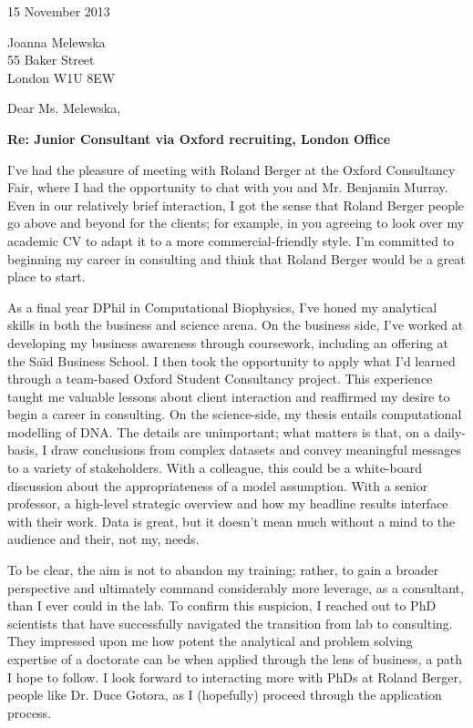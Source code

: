 \documentclass[a4paper]{../res}
\begin{document}
 
\begin{sloppypar}
 
%


\begin{resume} 

15 November 2013

Joanna Melewska \\
55 Baker Street \\
London W1U 8EW

Dear Ms. Melewska,

\textbf{Re: Junior Consultant via Oxford recruiting, London Office}

I've had the pleasure of meeting with Roland Berger at the Oxford Consultancy Fair, where I had the opportunity to chat with you and Mr. Benjamin Murray. Even in our relatively brief interaction, I got the sense that Roland Berger people go above and beyond for the clients; for example, in you agreeing to look over my academic CV to adapt it to a more commercial-friendly style. I'm committed to beginning my career in consulting and think that Roland Berger would be a great place to start. 

As a final year DPhil in Computational Biophysics, I've honed my analytical skills in both the business and science arena. On the business side, I've worked at developing my business awareness through coursework, including an offering at the Sa\"\i d Business School. I then took the opportunity to apply what I'd learned through a team-based Oxford Student Consultancy project. This experience taught me valuable lessons about client interaction and reaffirmed my desire to begin a career in consulting. On the science-side, my thesis entails computational modelling of DNA. The details are unimportant; what matters is that, on a daily-basis, I draw conclusions from complex datasets and convey meaningful messages to a variety of stakeholders. With a colleague, this could be a white-board discussion about the appropriateness of a model assumption. With a senior professor, a high-level strategic overview and how my headline results interface with their work. Data is great, but it doesn't mean much without a mind to the audience and their, not my, needs. 

To be clear, the aim is not to abandon my training; rather, to gain a broader perspective and ultimately command considerably more leverage, as a consultant, than I ever could in the lab. To confirm this suspicion, I reached out to PhD scientists that have successfully navigated the transition from lab to consulting. They impressed upon me how potent the analytical and problem solving expertise of a doctorate can be when applied through the lens of business, a path I hope to follow. I look forward to interacting more with PhDs at Roland Berger, people like Dr. Duce Gotora, as I (hopefully) proceed through the application process.



\end{resume}
\end{sloppypar}
\end{document}
